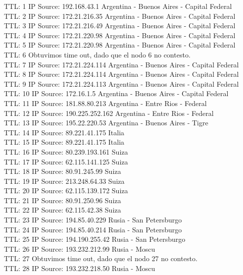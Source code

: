 TTL:  1    IP Source: 192.168.43.1       Argentina - Buenos Aires - Capital Federal\\
TTL:  2    IP Source: 172.21.216.35      Argentina - Buenos Aires - Capital Federal\\
TTL:  3    IP Source: 172.21.216.49      Argentina - Buenos Aires - Capital Federal\\
TTL:  4    IP Source: 172.21.220.98      Argentina - Buenos Aires - Capital Federal\\
TTL:  5    IP Source: 172.21.220.98      Argentina - Buenos Aires - Capital Federal\\
TTL:  6    Obtuvimos time out, dado que el nodo 6 no contesto. \\
TTL:  7    IP Source: 172.21.224.114     Argentina - Buenos Aires - Capital Federal\\
TTL:  8    IP Source: 172.21.224.114     Argentina - Buenos Aires - Capital Federal\\
TTL:  9    IP Source: 172.21.224.113     Argentina - Buenos Aires - Capital Federal\\
TTL: 10    IP Source: 172.16.1.5         Argentina - Buenos Aires - Capital Federal\\
TTL: 11    IP Source: 181.88.80.213      Argentina - Entre Rios - Federal\\
TTL: 12    IP Source: 190.225.252.162    Argentina - Entre Rios - Federal\\
TTL: 13    IP Source: 195.22.220.53      Argentina - Buenos Aires - Tigre\\
TTL: 14    IP Source: 89.221.41.175      Italia\\
TTL: 15    IP Source: 89.221.41.175      Italia \\
TTL: 16    IP Source: 80.239.193.161     Suiza\\
TTL: 17    IP Source: 62.115.141.125     Suiza\\
TTL: 18    IP Source: 80.91.245.99       Suiza\\
TTL: 19    IP Source: 213.248.64.33      Suiza \\
TTL: 20    IP Source: 62.115.139.172     Suiza \\
TTL: 21    IP Source: 80.91.250.96       Suiza\\
TTL: 22    IP Source: 62.115.42.38       Suiza\\
TTL: 23    IP Source: 194.85.40.229      Rusia - San Petersburgo\\
TTL: 24    IP Source: 194.85.40.214      Rusia - San Petersburgo\\
TTL: 25    IP Source: 194.190.255.42     Rusia - San Petersburgo \\
TTL: 26    IP Source: 193.232.212.99     Rusia - Moscu\\
TTL: 27    Obtuvimos time out, dado que el nodo 27 no contesto. \\
TTL: 28    IP Source: 193.232.218.50     Rusia - Moscu  \newline

